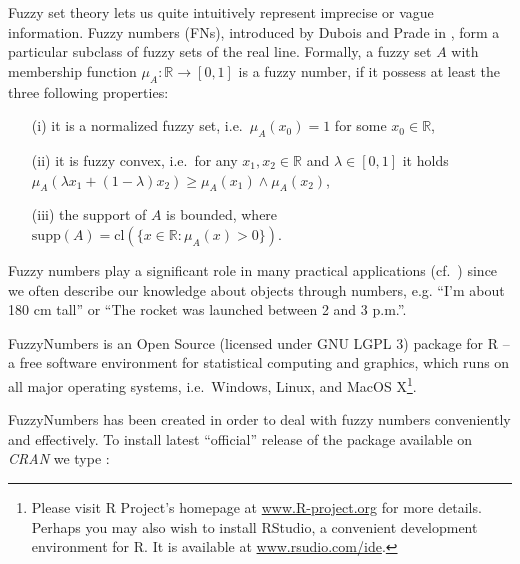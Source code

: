 \documentclass[11pt]{article}\usepackage[]{graphicx}\usepackage[]{color}
\newcommand{\package}[1]{\textsf{#1}\xspace}
\newcommand{\program}[1]{\textsf{#1}\xspace}
\newcommand{\os}[1]{\textsf{#1}\xspace}
\newcommand{\lang}[1]{\textsf{#1}\xspace}
\newcommand{\R}{\lang{R}}
\newif\ifDevelopmentVersion
\begin{document}
Fuzzy set theory lets us quite intuitively represent
imprecise or vague information. Fuzzy numbers (FNs), introduced
by Dubois and Prade in \cite{DuboisPrade1978:opfn}, form a particular
subclass of fuzzy sets of the real line.
Formally, a fuzzy set $A$
with membership function $\mu_A:\mathbb{R}\to[0,1]$
is a fuzzy number, if it possess at least the three following properties:
\begin{itemize}
\item[(i)] it is a normalized fuzzy set,
i.e.~$\mu_A(x_0)=1$ for some $x_0\in\mathbb{R}$,
\item[(ii)] it is fuzzy convex, i.e.~for any $x_1,x_2\in\mathbb{R}$
and $\lambda\in[0,1]$ it holds
$\mu_A(\lambda x_1 + (1-\lambda) x_2) \ge \mu_A(x_1)\wedge \mu_A(x_2)$,
\item[(iii)] the support of $A$ is bounded,
where $\mathrm{supp}(A) = \mathrm{cl}(\{x\in\mathbb{R}: \mu_A(x)>0\})$.
\end{itemize}
Fuzzy numbers play a significant role
in many practical applications
(cf.~\cite{KlirYuan1995:fuzzybook})
since we often describe our knowledge about objects
through numbers, e.g. ``I'm about 180 cm tall''
or ``The rocket was launched between 2 and 3 p.m.''.




\bigskip
\package{FuzzyNumbers} is an Open Source (licensed under GNU LGPL 3)
package for \R{} -- a free software environment
for statistical computing and graphics, which
runs on all major operating systems, i.e.~\os{Windows},
\os{Linux}, and \os{MacOS X}\footnote{%
Please visit \R Project's homepage at \href{http://www.R-project.org}{www.R-project.org}
for more details.
Perhaps you may also wish to install  \program{RStudio},
a convenient development environment for \R.
It is available at \href{http://www.rstudio.com/ide/}{www.rsudio.com/ide}.}.


\package{FuzzyNumbers} has been created in order to deal with fuzzy numbers
conveniently and effectively.
To install latest ``official'' release of the
package available on \textit{CRAN} we type%
\ifDevelopmentVersion%
\footnote{You are viewing the \textbf{development} version of the tutorial.
Some of the features presented in this document may be missing
in the current \textit{CRAN} release. Please, upgrade to the \textbf{latest} development version from
\href{https://github.com/Rexamine/FuzzyNumbers}{\textit{GitHub}}
if you need the new functionality.}\ignorespaces
\fi%
:
\end{document}
